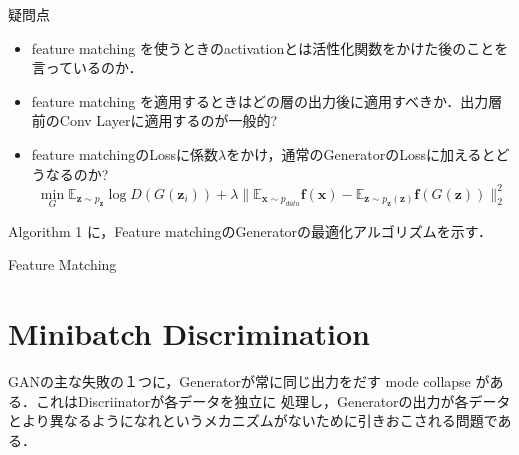 \documentclass[uplatex, dvipdfmx]{jsarticle}
\theoremstyle{definition}
\begin{document}
    \begin{itembox}[l]{疑問点}
        \begin{itemize}
            \item feature matching を使うときのactivationとは活性化関数をかけた後のことを言っているのか．
            \item feature matching を適用するときはどの層の出力後に適用すべきか．出力層前のConv Layerに適用するのが一般的?
            \item feature matchingのLossに係数$\lambda$をかけ，通常のGeneratorのLossに加えるとどうなるのか?
            \begin{equation*}
                \min_G  \mathbb{E}_{\bm{z} \sim p_{\bm{z}}}\log D \left( G(\bm{z}_i) \right) + \lambda \| \mathbb{E}_{\bm{x} \sim p_{data}} \bm{f}(\bm{x}) - \mathbb{E}_{\bm{z} \sim p_{\bm{z}}(\bm{z})} \bm{f} (G(\bm{z})) \|_2^2
            \end{equation*}
        \end{itemize}
    \end{itembox}
    
    Algorithm 1 に，Feature matchingのGeneratorの最適化アルゴリズムを示す．
    \begin{algorithm}[H] 
	 \caption{Feature Matching}
	 \begin{algorithmic}[1]
	 \end{algorithmic}
	\end{algorithm}

    \section{Minibatch Discrimination}
    GANの主な失敗の１つに，Generatorが常に同じ出力をだす mode collapse がある．これはDiscriinatorが各データを独立に
    処理し，Generatorの出力が各データとより異なるようになれというメカニズムがないために引きおこされる問題である．
    
\end{document}
